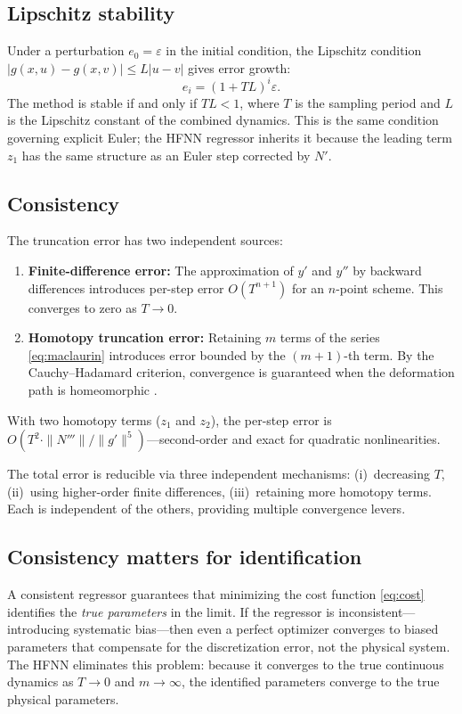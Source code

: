 \documentclass[preprint,12pt]{elsarticle}
\begin{document}
\subsection{Lipschitz stability}
Under a perturbation $e_0 = \varepsilon$ in the initial condition, the Lipschitz condition $|g(x,u) - g(x,v)| \le L|u-v|$ gives error growth:
\begin{equation}
e_i = (1 + TL)^i \varepsilon.
\label{eq:lipschitz}
\end{equation}
The method is stable if and only if $TL < 1$, where $T$ is the sampling period and $L$ is the Lipschitz constant of the combined dynamics. This is the same condition governing explicit Euler; the HFNN regressor inherits it because the leading term $z_1$ has the same structure as an Euler step corrected by $N'$.

\subsection{Consistency}
\label{sec:consistency}
The truncation error has two independent sources:
\begin{enumerate}
\item \textbf{Finite-difference error:} The approximation of $y'$ and $y''$ by backward differences introduces per-step error $O(T^{n+1})$ for an $n$-point scheme. This converges to zero as $T \to 0$.
\item \textbf{Homotopy truncation error:} Retaining $m$ terms of the series \eqref{eq:maclaurin} introduces error bounded by the $(m+1)$-th term. By the Cauchy--Hadamard criterion, convergence is guaranteed when the deformation path is homeomorphic \cite{liao2003}.
\end{enumerate}
With two homotopy terms ($z_1$ and $z_2$), the per-step error is $O(T^2 \cdot \|N'''\| / \|g'\|^5)$---second-order and exact for quadratic nonlinearities.

The total error is reducible via three independent mechanisms: (i)~decreasing $T$, (ii)~using higher-order finite differences, (iii)~retaining more homotopy terms. Each is independent of the others, providing multiple convergence levers.

\subsection{Consistency matters for identification}
A consistent regressor guarantees that minimizing the cost function \eqref{eq:cost} identifies the \emph{true parameters} in the limit. If the regressor is inconsistent---introducing systematic bias---then even a perfect optimizer converges to biased parameters that compensate for the discretization error, not the physical system. The HFNN eliminates this problem: because it converges to the true continuous dynamics as $T \to 0$ and $m \to \infty$, the identified parameters converge to the true physical parameters.
\end{document}

